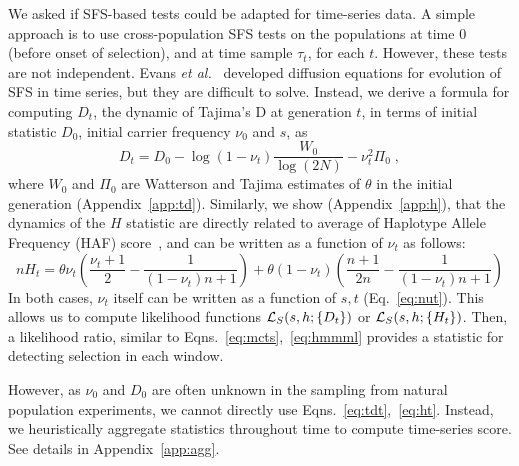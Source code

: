 \documentclass[11pt]{article}
\begin{document}
We asked if SFS-based tests could be adapted for time-series data. A
simple approach is to use cross-population SFS tests on the
populations at time $0$ (before onset of selection), and at time
sample $\tau_t$, for each $t$. However, these tests are not
independent. Evans \emph{et al.}~\cite{evans2007non} developed diffusion
equations for evolution of SFS in time series, but they are difficult
to solve. Instead, we derive a formula for computing $D_t$, the
dynamic of Tajima's D at generation $t$, in terms of initial statistic
$D_0$, initial carrier frequency $\nu_0$ and $s$, as
\begin{equation}
  D_t=D_0-\log(1-\nu_t) \frac{W_0}{\log(2N)} -\nu_t^2 \Pi_0\;,
  \label{eq:tdt}    
\end{equation}
where $W_0$ and $\Pi_0$ are Watterson and Tajima estimates of $\theta$
in the initial generation (Appendix~\ref{app:td}). Similarly, we show
(Appendix~\ref{app:h}), that the dynamics of the $H$ statistic are
directly related to average of Haplotype Allele Frequency (HAF)
score~\cite{ronen2015predicting}, and can be written as a function of
$\nu_t$ as follows:
\begin{equation}
  nH_t= \theta \nu_t \left(\frac{\nu_t+1}{2} -
    \frac{1}{(1-\nu_t)n+1}\right) + \theta
  (1-\nu_t)\left(\frac{n+1}{2n}-\frac{1}{(1-\nu_t)n+1}\right)
  \label{eq:ht}
\end{equation}	
In both cases, $\nu_t$ itself can be written as a function of $s,t$
(Eq.~\ref{eq:nut}). This allows us to compute likelihood functions
${\cal L}_S(s,h; \{D_t\})$ or ${\cal L}_S(s,h; \{H_t\})$. Then, a likelihood
ratio, similar to Eqns.~\ref{eq:mcts},~\ref{eq:hmmml} provides a
statistic for detecting selection in each window.

However, as $\nu_0$ and $D_0$ are often unknown in the sampling from
natural population experiments, we cannot directly use
Eqns.~\ref{eq:tdt},~\ref{eq:ht}. Instead, we heuristically aggregate statistics
throughout time to compute time-series score. See details in
Appendix~\ref{app:agg}.


		
\end{document}
